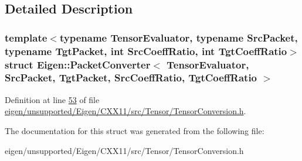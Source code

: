 \subsection{Detailed Description}
\subsubsection*{template$<$typename Tensor\+Evaluator, typename Src\+Packet, typename Tgt\+Packet, int Src\+Coeff\+Ratio, int Tgt\+Coeff\+Ratio$>$\newline
struct Eigen\+::\+Packet\+Converter$<$ Tensor\+Evaluator, Src\+Packet, Tgt\+Packet, Src\+Coeff\+Ratio, Tgt\+Coeff\+Ratio $>$}



Definition at line \hyperlink{eigen_2unsupported_2_eigen_2_c_x_x11_2src_2_tensor_2_tensor_conversion_8h_source_l00053}{53} of file \hyperlink{eigen_2unsupported_2_eigen_2_c_x_x11_2src_2_tensor_2_tensor_conversion_8h_source}{eigen/unsupported/\+Eigen/\+C\+X\+X11/src/\+Tensor/\+Tensor\+Conversion.\+h}.



The documentation for this struct was generated from the following file\+:\begin{DoxyCompactItemize}
\item 
eigen/unsupported/\+Eigen/\+C\+X\+X11/src/\+Tensor/\+Tensor\+Conversion.\+h\end{DoxyCompactItemize}
